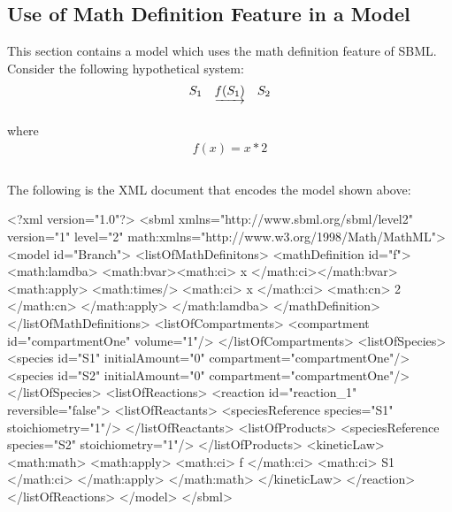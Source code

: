 \documentclass[10pt]{cekarticle}
\begin{document}
\subsection{Use of Math Definition Feature in a Model}
\label{sec:functioneg}

This section contains a model which uses the math definition
feature of SBML.  Consider the following hypothetical system:
\begin{equation*}
  \begin{array}{@{}ccc@{}}
    S_1 & \underrightarrow{f(S_1)} & S_2 \\ \\[-4pt]
  \end{array}
\end{equation*}
where
\begin{equation*}
  \begin{array}{l}
    f(x) = x * 2 \\ \\[-4pt]
  \end{array}
\end{equation*}

The following is the XML document that encodes the model shown
above:

\begin{example}
<?xml version="1.0"?>
<sbml xmlns="http://www.sbml.org/sbml/level2" version="1" level="2"
      math:xmlns="http://www.w3.org/1998/Math/MathML">
    <model id="Branch">
        <listOfMathDefinitons>
            <mathDefinition id="f">
                <math:lamdba>
                    <math:bvar><math:ci> x </math:ci></math:bvar>
                    <math:apply>
                        <math:times/>
                        <math:ci> x </math:ci>
                        <math:cn> 2 </math:cn>
                    </math:apply>
                </math:lamdba>
            </mathDefinition>
        </listOfMathDefinitions>
        <listOfCompartments>
            <compartment id="compartmentOne" volume="1"/>
        </listOfCompartments>
        <listOfSpecies>
            <species id="S1" initialAmount="0" compartment="compartmentOne"/>
            <species id="S2" initialAmount="0" compartment="compartmentOne"/>
        </listOfSpecies>
        <listOfReactions>
            <reaction id="reaction_1" reversible="false">
                <listOfReactants>
                    <speciesReference species="S1" stoichiometry="1"/>
                </listOfReactants>
                <listOfProducts>
                    <speciesReference species="S2" stoichiometry="1"/>
                </listOfProducts>
                <kineticLaw>
                    <math:math>
                        <math:apply>
                            <math:ci> f </math:ci>
                            <math:ci> S1 </math:ci>
                         </math:apply>
                    </math:math>
                </kineticLaw>
            </reaction>
        </listOfReactions>
    </model>
</sbml>
\end{example}
\end{document}
